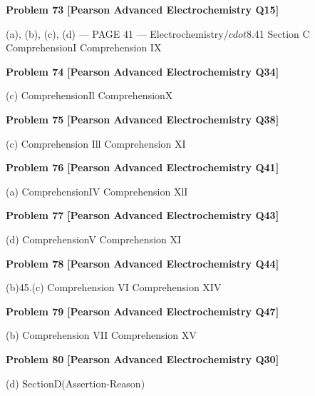 \begin{problembox}
\textbf{Problem 73} \hfill \textbf{[Pearson Advanced Electrochemistry Q15]}
\label{q:ext-pearson-73}

(a), (b), (c), (d)
--- PAGE 41 ---
Electrochemistry$/cdot$8.41
Section C
ComprehensionI
Comprehension IX
\end{problembox}

\begin{problembox}
\textbf{Problem 74} \hfill \textbf{[Pearson Advanced Electrochemistry Q34]}
\label{q:ext-pearson-74}

(c)
ComprehensionIl
ComprehensionX
\end{problembox}

\begin{problembox}
\textbf{Problem 75} \hfill \textbf{[Pearson Advanced Electrochemistry Q38]}
\label{q:ext-pearson-75}

(c)
Comprehension Ill
Comprehension XI
\end{problembox}

\begin{problembox}
\textbf{Problem 76} \hfill \textbf{[Pearson Advanced Electrochemistry Q41]}
\label{q:ext-pearson-76}

(a)
ComprehensionIV
Comprehension XlI
\end{problembox}

\begin{problembox}
\textbf{Problem 77} \hfill \textbf{[Pearson Advanced Electrochemistry Q43]}
\label{q:ext-pearson-77}

(d)
ComprehensionV
Comprehension XI
\end{problembox}

\begin{problembox}
\textbf{Problem 78} \hfill \textbf{[Pearson Advanced Electrochemistry Q44]}
\label{q:ext-pearson-78}

(b)45.(c)
Comprehension VI
Comprehension XIV
\end{problembox}

\begin{problembox}
\textbf{Problem 79} \hfill \textbf{[Pearson Advanced Electrochemistry Q47]}
\label{q:ext-pearson-79}

(b)
Comprehension VII
Comprehension XV
\end{problembox}

\begin{problembox}
\textbf{Problem 80} \hfill \textbf{[Pearson Advanced Electrochemistry Q30]}
\label{q:ext-pearson-80}

(d)
SectionD(Assertion-Reason)
\end{problembox}

